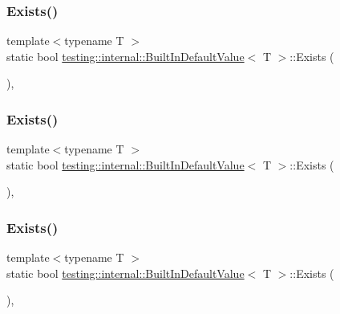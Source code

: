 \subsubsection{\texorpdfstring{Exists()}{Exists()}\hspace{0.1cm}{\footnotesize\ttfamily [1/3]}}
{\footnotesize\ttfamily template$<$typename T $>$ \\
static bool \mbox{\hyperlink{classtesting_1_1internal_1_1_built_in_default_value}{testing\+::internal\+::\+Built\+In\+Default\+Value}}$<$ T $>$\+::Exists (\begin{DoxyParamCaption}{ }\end{DoxyParamCaption})\hspace{0.3cm}{\ttfamily [inline]}, {\ttfamily [static]}}

\mbox{\label{classtesting_1_1internal_1_1_built_in_default_value_a35207bc20a493b0efb3980eb9a08dd2f}} 
\subsubsection{\texorpdfstring{Exists()}{Exists()}\hspace{0.1cm}{\footnotesize\ttfamily [2/3]}}
{\footnotesize\ttfamily template$<$typename T $>$ \\
static bool \mbox{\hyperlink{classtesting_1_1internal_1_1_built_in_default_value}{testing\+::internal\+::\+Built\+In\+Default\+Value}}$<$ T $>$\+::Exists (\begin{DoxyParamCaption}{ }\end{DoxyParamCaption})\hspace{0.3cm}{\ttfamily [inline]}, {\ttfamily [static]}}

\mbox{\label{classtesting_1_1internal_1_1_built_in_default_value_a35207bc20a493b0efb3980eb9a08dd2f}} 
\subsubsection{\texorpdfstring{Exists()}{Exists()}\hspace{0.1cm}{\footnotesize\ttfamily [3/3]}}
{\footnotesize\ttfamily template$<$typename T $>$ \\
static bool \mbox{\hyperlink{classtesting_1_1internal_1_1_built_in_default_value}{testing\+::internal\+::\+Built\+In\+Default\+Value}}$<$ T $>$\+::Exists (\begin{DoxyParamCaption}{ }\end{DoxyParamCaption})\hspace{0.3cm}{\ttfamily [inline]}, {\ttfamily [static]}}

